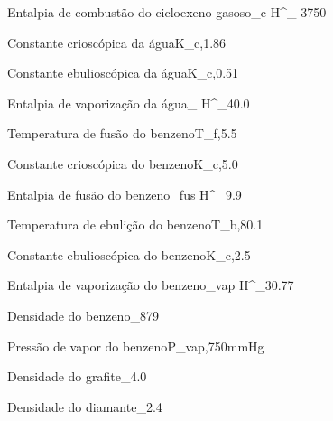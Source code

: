 
{Entalpia de combustão do cicloexeno gasoso}{\Delta_{c} H^{\standardstate}_{}}{-3750}{\kilo\joule\per\mol}

%                                              
%                                              

{Constante crioscópica da água}{K_{c,}}{1.86}{\kilo\gram\kelvin\per\mol}

{Constante ebulioscópica da água}{K_{c,}}{0.51}{\kilo\gram\kelvin\per\mol}

{Entalpia de vaporização da água}{\Delta_ H^{\standardstate}_{}}{40.0}{\kilo\joule\per\mol}


{Temperatura de fusão do benzeno}{T_{f,}}{5.5}{\celsius}

{Constante crioscópica do benzeno}{K_{c,}}{5.0}{\kilo\gram\kelvin\per\mol}

{Entalpia de fusão do benzeno}{\Delta_{fus} H^{\standardstate}_{}}{9.9}{\kilo\joule\per\mol}

{Temperatura de ebulição do benzeno}{T_{b,}}{80.1}{\celsius}

{Constante ebulioscópica do benzeno}{K_{c,}}{2.5}{\kilo\gram\kelvin\per\mol}

{Entalpia de vaporização do benzeno}{\Delta_{vap} H^{\standardstate}_{}}{30.77}{\kilo\joule\per\mol}

{Densidade do benzeno}{\rho_{}}{879}{\kilo\gram\per\cubic\meter}

{Pressão de vapor do benzeno}{P_{vap,}}{750}{mmHg}


{Densidade do grafite}{\rho_}{4.0}{\gram\per\cubic\centi\meter}

{Densidade do diamante}{\rho_}{2.4}{\gram\per\cubic\centi\meter}



